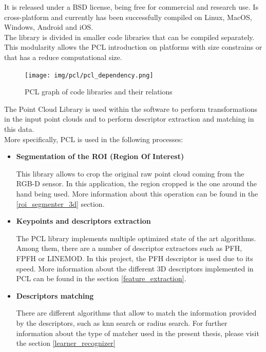 It is released under a BSD license, being free for commercial and research use. Is cross-platform and currently has been successfully compiled on Linux, MacOS, Windows, Android and iOS. \\

The library is divided in smaller code libraries that can be compiled separately. This modularity allows the PCL introduction on platforms with size constrains or that has a reduce computational size. \cite{Rusu_ICRA2011_PCL}
\\



\begin{figure}[h]
	\begin{center}
    \texttt{[image: img/pcl/pcl\_dependency.png]}
	\caption[PCL graph of libraries]{PCL graph of code libraries and their relations}
	\end{center}
\end{figure}

		The Point Cloud Library is used within the software to perform transformations in the input point clouds and to perform descriptor extraction and matching in this data. 
		\\

		More specifically, PCL is used in the following processes: 

		\begin{itemize}
			\item{\textbf{Segmentation of the ROI (Region Of Interest)\\ }}

			This library allows to crop the original raw point cloud coming from the RGB-D sensor. In this application, the region cropped is the one around the hand being used. More information about this operation can be found in the \ref{roi_segmenter_3d} section. 
			

			\item{\textbf{ Keypoints and descriptors extraction\\ }}

			 The PCL library implements multiple optimized state of the art algorithms. Among them, there are a number of descriptor extractors such as PFH, FPFH or LINEMOD. In this project, the PFH descriptor is used due to its speed. More information about the different 3D descriptors implemented in PCL can be found in the section  \ref{feature_extraction}.


			\item {\textbf{Descriptors matching\\ }}

			There are different algorithms that allow to match the information provided by the descriptors, such as knn search or radius search. For further information about the type of matcher used in the present thesis, please visit the section \ref{learner_recognizer}
		\end{itemize}



